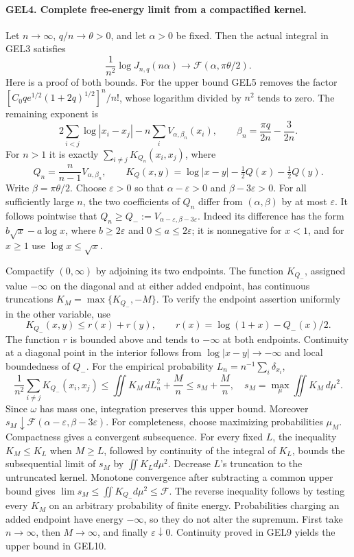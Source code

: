 \documentclass[11pt,a4paper]{article}
\begin{document}
\paragraph{GEL4. Complete free-energy limit from a compactified kernel.}
Let \(n\to\infty\), \(q/n\to\theta>0\), and let \(\alpha>0\) be fixed.
Then the actual integral in GEL3 satisfies
\[
 \boxed{\frac1{n^2}\log J_{n,q}(n\alpha)
       \longrightarrow\mathcal F(\alpha,\pi\theta/2).}
 \tag{GEL10}
\]
Here is a proof of both bounds. For the upper bound GEL5 removes the
factor \([C_0q e^{1/2}(1+2q)^{1/2}]^n/n!\), whose logarithm divided by
\(n^2\) tends to zero. The remaining exponent is
\[
 2\sum_{i<j}\log|x_i-x_j|-n\sum_iV_{\alpha,\beta_n}(x_i),
 \qquad \beta_n=\frac{\pi q}{2n}-\frac3{2n}.
\]
For \(n>1\) it is exactly
\(\sum_{i\ne j}K_{Q_n}(x_i,x_j)\), where
\[
 Q_n=\frac n{n-1}V_{\alpha,\beta_n},\qquad
 K_Q(x,y)=\log|x-y|-\tfrac12Q(x)-\tfrac12Q(y).
\]
Write \(\beta=\pi\theta/2\). Choose \(\varepsilon>0\) so that
\(\alpha-\varepsilon>0\) and \(\beta-3\varepsilon>0\).
For all sufficiently large \(n\), the two coefficients of \(Q_n\)
differ from \((\alpha,\beta)\) by at most \(\varepsilon\). It follows
pointwise that
\(Q_n\geq Q_-:=V_{\alpha-\varepsilon,\beta-3\varepsilon}\).
Indeed its difference has the form
\(b\sqrt x-a\log x\), where \(b\geq2\varepsilon\) and
\(0\leq a\leq2\varepsilon\); it is nonnegative for \(x<1\), and for
\(x\geq1\) use \(\log x\leq\sqrt x\).

Compactify \((0,\infty)\) by adjoining its two endpoints.
The function \(K_{Q_-}\), assigned value \(-\infty\) on the diagonal
and at either added endpoint, has continuous truncations
\(K_M=\max\{K_{Q_-},-M\}\). To verify the endpoint assertion uniformly
in the other variable, use
\[
 K_{Q_-}(x,y)\leq r(x)+r(y),\qquad
 r(x)=\log(1+x)-Q_-(x)/2.
\]
The function \(r\) is bounded above and tends to \(-\infty\) at both
endpoints. Continuity at a diagonal point in the interior follows from
\(\log|x-y|\to-\infty\) and local boundedness of \(Q_-\).
For the empirical probability \(L_n=n^{-1}\sum_i\delta_{x_i}\),
\[
 \frac1{n^2}\sum_{i\ne j}K_{Q_-}(x_i,x_j)
 \leq\iint K_M\,dL_n^2+\frac Mn
 \leq s_M+\frac Mn,
 \quad s_M=\max_{\mu}\iint K_M\,d\mu^2.
\]
Since \(\omega\) has mass one, integration preserves this upper bound.
Moreover \(s_M\downarrow\mathcal F(\alpha-\varepsilon,
\beta-3\varepsilon)\). For completeness, choose maximizing probabilities
\(\mu_M\). Compactness gives a convergent subsequence. For every fixed
\(L\), the inequality \(K_M\leq K_L\) when \(M\geq L\), followed by
continuity of the integral of \(K_L\), bounds the subsequential limit
of \(s_M\) by \(\iint K_Ld\mu^2\). Decrease \(L\)'s truncation to the
untruncated kernel. Monotone convergence after subtracting a common upper
bound gives \(\lim s_M\leq\iint K_{Q_-}d\mu^2\leq\mathcal F\).
The reverse inequality follows by testing every \(K_M\) on an arbitrary
probability of finite energy. Probabilities charging an added endpoint
have energy \(-\infty\), so they do not alter the supremum.
First take \(n\to\infty\), then \(M\to\infty\), and finally
\(\varepsilon\downarrow0\). Continuity proved in GEL9 yields the
upper bound in GEL10.
\end{document}
